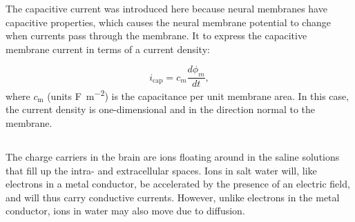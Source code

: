 The capacitive current was introduced here because neural membranes have capacitive properties, which causes the neural membrane potential to change when currents pass through the membrane. It  to express the capacitive membrane current in terms of a current density: 

\begin{equation}
i_\text{cap} = c_m\frac{d\phi_m}{dt}, 
\label{eq:Basics:Icap_mem}
\end{equation}
where $c_\text{m}$ (units \si{\farad\per\square\metre}) is the capacitance per unit membrane area. In this case, the current density is one-dimensional and in the direction normal to the membrane.


\subsection{}
\label{sec:Basics:DiffusiveCurrent} 
 
The charge carriers in the brain are ions floating around in the saline solutions that fill up the intra- and extracellular spaces. Ions in salt water will, like electrons in a metal conductor, be accelerated by the presence of an electric field, and will thus carry conductive currents. However, unlike electrons in the metal conductor, ions in water may also move due to diffusion. 


